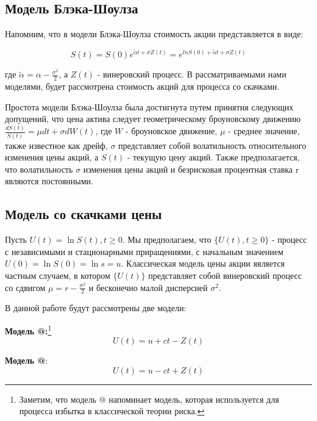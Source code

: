 \documentclass[a4paper,12pt]{article}
\makeatletter
\theoremstyle{definition}
\newcommand*{\rom}[1]{\expandafter\@slowromancap\romannumeral #1@}
\makeatother
\begin{document}
\subsection{Модель Блэка-Шоулза}

Напомним, что в модели Блэка-Шоулза стоимость акции представляется в виде:

\begin{equation}\label{eq:black_sholes_equation}
    S(t) = S(0) e^{\tilde{\alpha} t + \sigma Z(t)} = e^{ln S(0) + \tilde{\alpha} t + \sigma Z(t)}
\end{equation}

где $\tilde{\alpha} = \alpha - \frac{\sigma^2}{2}$, а $Z (t)$ - винеровский процесс. В рассматриваемыми нами моделями, будет рассмотрена стоимость акций для процесса со скачками.

Простота модели Блэка-Шоулза была достигнута путем принятия следующих допущений, что цена актива следует геометрическому броуновскому движению $\frac{dS(t)}{S(t)} = \mu dt + \sigma dW(t)$, где $W$ - броуновское движение, $\mu$ - среднее значение, также известное как дрейф, $\sigma$ представляет собой волатильность относительного изменения цены акций, а $S(t)$ - текущую цену акций. Также предполагается, что волатильность $\sigma$ изменения цены акций и безрисковая процентная ставка r являются постоянными.

\subsection{Модель со скачками цены}

Пусть $U(t) = \ln{S(t)}, t \ge 0$. Мы предполагаем, что $\{U(t), t \ge 0\}$ - процесс с независимыми и стационарными приращениями, с начальным значением $U(0) = \ln{S(0)} = \ln{s} = u$. Классическая модель цены акции является частным случаем, в котором $\{U(t)\}$ представляет собой винеровский процесс со сдвигом $\mu = r - \frac{\sigma ^ {2}}{2}$ и бесконечно малой дисперсией $\sigma ^ {2}$. 

В данной работе будут рассмотрены две модели:

\textbf{Модель \rom{1}:}\footnote{Заметим, что модель \rom{1} напоминает модель, которая используется для процесса избытка в классической теории риска.}
\begin{equation}\label{eq:model1_definition}
    U(t) = u + ct - Z(t)
\end{equation}

\textbf{Модель \rom{2}}: 
\begin{equation}\label{eq:model2_definition}
    U(t) = u - ct + Z(t)
\end{equation}
\end{document}
